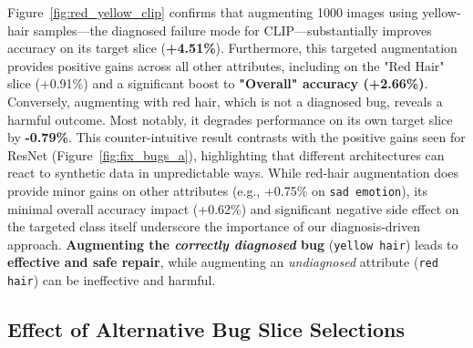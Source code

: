 \documentclass[10pt]{article} %
\begin{document}
Figure~\ref{fig:red_yellow_clip} confirms that augmenting 1000 images using yellow-hair samples—the diagnosed failure mode for CLIP—substantially improves accuracy on its target slice (\textbf{+4.51\%}). Furthermore, this targeted augmentation provides positive gains across all other attributes, including on the "Red Hair" slice (+0.91\%) and a significant boost to \textbf{"Overall" accuracy (+2.66\%)}. 
Conversely, augmenting with red hair, which is not a diagnosed bug, reveals a harmful outcome. Most notably, it degrades performance on its own target slice by \textbf{-0.79\%}. This counter-intuitive result contrasts with the positive gains seen for ResNet (Figure~\ref{fig:fix_bugs_a}), highlighting that different architectures can react to synthetic data in unpredictable ways. 
While red-hair augmentation does provide minor gains on other attributes (e.g., +0.75\% on \texttt{sad emotion}), its minimal overall accuracy impact (+0.62\%) and significant negative side effect on the targeted class itself underscore the importance of our diagnosis-driven approach. \textbf{Augmenting the \textit{correctly diagnosed} bug} (\texttt{yellow hair}) leads to \textbf{effective and safe repair}, while augmenting an \textit{undiagnosed} attribute (\texttt{red hair}) can be ineffective and harmful.


\subsection{Effect of Alternative Bug Slice Selections}

\begin{table}[t]
\centering
\footnotesize
\renewcommand{\arraystretch}{0.95}
\caption{Fix Rate (FR \%) for attribute-variant selections. Ours is the RH\_BS\_SE combination.}
\label{tab:base_and_attribute_variants}
\vspace{-14pt}
\end{table}
\end{document}
